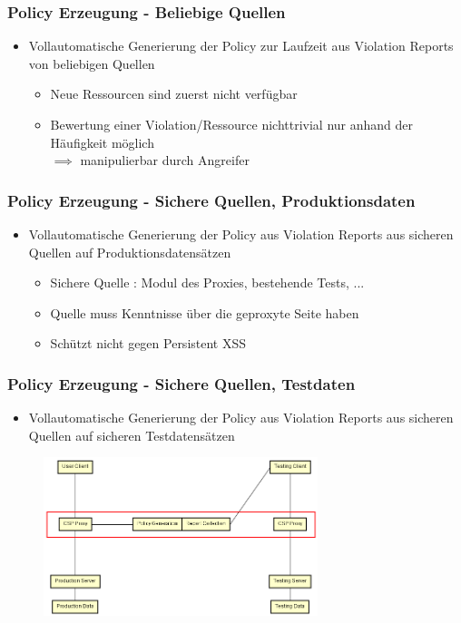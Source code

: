 \documentclass[handout]{beamer}
\begin{document}
\begin{frame}[c]
\frametitle{Policy Erzeugung - Beliebige Quellen}
\begin{itemize}
\item Vollautomatische Generierung der Policy zur Laufzeit aus Violation Reports von beliebigen Quellen
\begin{itemize}
\item Neue Ressourcen sind zuerst nicht verfügbar
\item Bewertung einer Violation/Ressource nichttrivial nur anhand der Häufigkeit möglich \\$\implies$ manipulierbar durch Angreifer
\end{itemize}
\end{itemize}
\end{frame}

\begin{frame}[c]
\frametitle{Policy Erzeugung - Sichere Quellen, Produktionsdaten}
\begin{itemize}
\item Vollautomatische Generierung der Policy aus Violation Reports aus sicheren Quellen auf Produktionsdatensätzen
\begin{itemize}
\item Sichere Quelle : Modul des Proxies, bestehende Tests, ...
\item Quelle muss Kenntnisse über die geproxyte Seite haben
\item Schützt nicht gegen Persistent XSS 
\end{itemize}
\end{itemize}
\end{frame}

\begin{frame}[c]
\frametitle{Policy Erzeugung - Sichere Quellen, Testdaten}
\begin{itemize}
\item Vollautomatische Generierung der Policy aus Violation Reports aus sicheren Quellen auf sicheren Testdatensätzen
\end{itemize}
\begin{figure}[ht]
	\centering
	\includegraphics[width=8cm]{schema_2.png}
\end{figure}
\end{frame}
\end{document}
